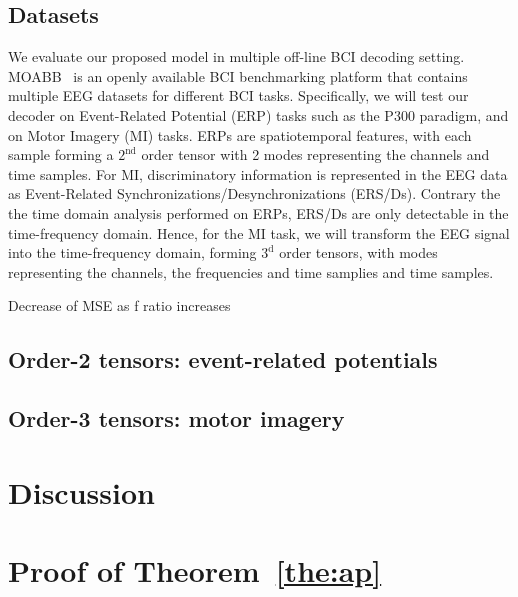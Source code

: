 \documentclass[twocolumn]{article}
\begin{document}
\subsection{Datasets}
We evaluate our proposed model in multiple off-line BCI decoding setting.
MOABB~\cite{Aristimunha2023} is an openly available BCI benchmarking platform that contains
multiple EEG datasets for different BCI tasks.
Specifically, we will test our decoder on Event-Related Potential (ERP) tasks
such as the P300 paradigm, and on Motor Imagery (MI) tasks.
ERPs are spatiotemporal features, with each sample forming a $2^\text{nd}$
order tensor with 2 modes representing the channels and time samples.
For MI, discriminatory information is represented in the EEG data as
Event-Related Synchronizations/Desynchronizations (ERS/Ds).
Contrary the the time domain analysis performed on ERPs, ERS/Ds are only
detectable in the time-frequency domain.
Hence, for the MI task, we will transform the EEG signal into the
time-frequency domain, forming $3^\text{d}$ order tensors, with modes
representing the channels, the frequencies and time samplies and time samples.

Decrease of MSE as f ratio increases
\subsection{Order-2 tensors: event-related potentials}


\subsection{Order-3 tensors: motor imagery}
\section{Discussion}


\printbibliography

\appendix
\section{Proof of Theorem~\ref{the:ap}}
\end{document}
